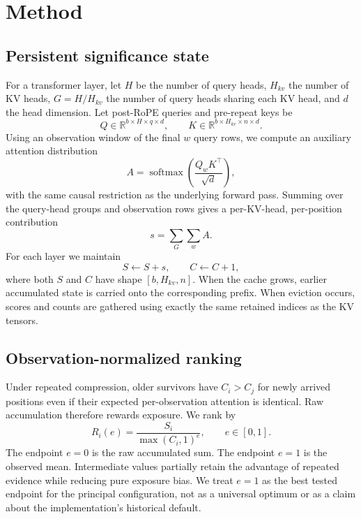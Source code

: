 \documentclass[10pt,twocolumn]{article}
\begin{document}
\section{Method}
\subsection{Persistent significance state}
For a transformer layer, let $H$ be the number of query heads, $H_{kv}$ the number of KV heads, $G=H/H_{kv}$ the number of query heads sharing each KV head, and $d$ the head dimension. Let post-RoPE queries and pre-repeat keys be
\begin{equation}
Q\in\mathbb{R}^{b\times H\times q\times d},\qquad
K\in\mathbb{R}^{b\times H_{kv}\times n\times d}.
\end{equation}
Using an observation window of the final $w$ query rows, we compute an auxiliary attention distribution
\begin{equation}
A=\operatorname{softmax}\!\left(\frac{Q_wK^\top}{\sqrt d}\right),
\end{equation}
with the same causal restriction as the underlying forward pass. Summing over the query-head groups and observation rows gives a per-KV-head, per-position contribution
\begin{equation}
s=\sum_G\sum_w A.
\end{equation}
For each layer we maintain
\begin{equation}
S\leftarrow S+s,\qquad C\leftarrow C+1,
\end{equation}
where both $S$ and $C$ have shape $[b,H_{kv},n]$. When the cache grows, earlier accumulated state is carried onto the corresponding prefix. When eviction occurs, scores and counts are gathered using exactly the same retained indices as the KV tensors.

\subsection{Observation-normalized ranking}
Under repeated compression, older survivors have $C_i>C_j$ for newly arrived positions even if their expected per-observation attention is identical. Raw accumulation therefore rewards exposure. We rank by
\begin{equation}
R_i(e)=\frac{S_i}{\max(C_i,1)^e},\qquad e\in[0,1].
\end{equation}
The endpoint $e=0$ is the raw accumulated sum. The endpoint $e=1$ is the observed mean. Intermediate values partially retain the advantage of repeated evidence while reducing pure exposure bias. We treat $e=1$ as the best tested endpoint for the principal configuration, not as a universal optimum or as a claim about the implementation's historical default.
\end{document}
